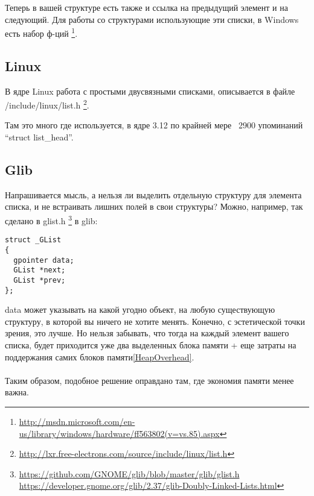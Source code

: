 Теперь в вашей структуре есть также и ссылка на предыдущий элемент и на следующий.
Для работы со структурами использующие эти списки, в Windows есть набор ф-ций
\footnote{\url{http://msdn.microsoft.com/en-us/library/windows/hardware/ff563802(v=vs.85).aspx}}.

\subsection{Linux}

В ядре Linux работа с простыми двусвязными списками, описывается в файле /include/linux/list.h
\footnote{\url{http://lxr.free-electrons.com/source/include/linux/list.h}}.

Там это много где используется, в ядре 3.12 по крайней мере ~2900 упоминаний ``struct list\_head''.

\subsection{Glib}

Напрашивается мысль, а нельзя ли выделить отдельную структуру для элемента списка, и не встраивать лишних полей
в свои структуры? Можно, например, так сделано в glist.h
\footnote{\url{https://github.com/GNOME/glib/blob/master/glib/glist.h} 
\url{https://developer.gnome.org/glib/2.37/glib-Doubly-Linked-Lists.html}} в glib:

\begin{lstlisting}
struct _GList
{
  gpointer data;
  GList *next;
  GList *prev;
};
\end{lstlisting}

data может указывать на какой угодно объект, на любую существующую структуру, в которой вы ничего не хотите менять.
Конечно, с эстетической точки зрения, это лучше. Но нельзя забывать, что тогда на каждый элемент вашего списка,
будет приходится уже два выделенных блока памяти + еще затраты на поддержания самих блоков памяти\ref{HeapOverhead}. \\
\\
Таким образом, подобное решение оправдано там, где экономия памяти менее важна.

